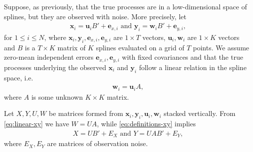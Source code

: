 \documentclass[preprint]{imsart}
\numberwithin{equation}{section}
\theoremstyle{plain}
\newcommand{\cN}{\mathcal{N}}
\newcommand{\tr}[1]{{\textcolor{red}{#1}}}
\newcommand{\by}{\mathbf{y}}
\newcommand{\bx}{\mathbf{x}}
\newcommand{\bw}{\mathbf{w}}
\newcommand{\bu}{\mathbf{u}}
\newcommand{\be}{\mathbf{e}}
\begin{document}


Suppose, as previously, that the true processes are in a low-dimensional space of splines, but they are observed with noise. More precisely, let
\begin{align}\label{eq:definitions-xy}
  \bx_i = \bu_iB' + \be_{x,i} \text{\ \ and\ \ } \by_i = \bw_iB' + \be_{y,i},
\end{align}
for $1 \leq i \leq N$, where $\bx_i,\by_i,\be_{x,i},\be_{y,i}$ are $1 \times T$ vectors, $\bu_i,\bw_i$ are $1 \times K$ vectors and $B$ is a $T \times K$ matrix of $K$ splines evaluated on a grid of $T$ points. We assume zero-mean independent errors $\be_{x,i},\be_{y,i}$ with fixed covariances and that the true processes underlying the observed $\bx_i$ and $\by_i$ follow a linear relation in the spline space, i.e.
\begin{align}\label{eq:linear-xy}
  \bw_i = \bu_iA,
\end{align}
where $A$ is some unknown $K \times K$ matrix.

Let $X,Y,U,W$ be matrices formed from $\bx_i,\by_i,\bu_i,\bw_i$ stacked vertically. From \eqref{eq:linear-xy} we have $W = UA$, while \eqref{eq:definitions-xy} implies
\begin{align}\label{eq:almost-errors-in-variables}
X = UB' + E_X \text{ \ and \ } Y = UA B' + E_{Y},
\end{align}
where $E_X,E_Y$ are matrices of observation noise.
\end{document}
